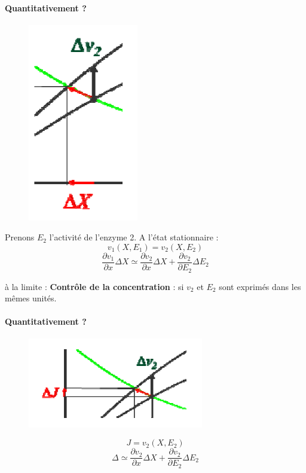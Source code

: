 \paragraph{Quantitativement ?}
\begin{figure}
	\centering
	\includegraphics{Images/02_2.PNG}
\end{figure}
Prenons $E_2$ l'activité de l'enzyme 2. A l'état stationnaire :
$$ v_1(X,E_1) = v_2(X,E_2) $$
$$ \frac{\partial v_1}{\partial x} \Delta X \simeq \frac{\partial v_2}{\partial x} \Delta X + \frac{\partial v_2}{\partial E_2} \Delta E_2 $$

à la limite :
\textbf{Contrôle de la concentration} : 
si $v_2$ et $E_2$ sont exprimés dans les mêmes unités. 


\paragraph{Quantitativement ?}
\begin{figure}
	\centering
	\includegraphics{Images/02_3.PNG}
\end{figure}
$$ J=v_2(X,E_2) $$
$$ \Delta \simeq \frac{\partial v_2}{\partial x} \Delta X + \frac{\partial v_2}{\partial E_2} \Delta E_2 $$


